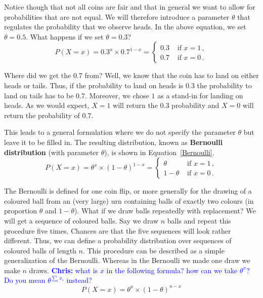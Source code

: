 \documentclass[a4paper,11pt,leqno]{report}
\newcommand{\chris}[1]{ \textcolor{blue}{\textbf{Chris:} #1}}
\begin{document}
Notice though that not all coins are fair and that in general we want to allow for probabilities that are not equal. 
We will therefore introduce a parameter $ \theta $ that regulates the probability that we observe heads. In the
above equation, we set $ \theta = 0.5 $. What happens if we set $ \theta = 0.3 $?
\begin{equation}
P(X=x) = 0.3^{x} \times 0.7^{1-x} = 
\begin{cases}
0.3 & \mbox{ if $x=1$} \, , \\
0.7 & \mbox{ if $x=0$} \, .
\end{cases}
\end{equation}

Where did we get the 0.7 from? Well, we know that the coin has to land on either heads or tails. Thus, if the probability
to land on heads is $ 0.3 $ the probability to land on tails has to be $ 0.7 $. Moreover, we chose $ 1 $ as a stand-in for
landing on heads. As we would expect, $ X = 1 $ will return the $ 0.3 $ probability and $ X = 0 $ will return the probability of $ 0.7 $.

This leads to a general formulation where we do not specify the parameter $ \theta $ but leave it to be filled in. 
The resulting distribution, known as \textbf{Bernoulli distribution} (with parameter $ \theta $), is shown in Equation~\eqref{Bernoulli}.
\begin{equation}\label{Bernoulli}
P(X=x) = \theta^{x} \times (1 - \theta)^{1-x} =
\begin{cases}
\theta & \mbox{ if $x=1$} \, , \\
1-\theta & \mbox{ if $x=0$} \, .
\end{cases}
\end{equation}

The Bernoulli is defined for one coin flip, or more generally for the
drawing of a coloured ball from an (very large) urn containing balls
of exactly two colours (in proportion $\theta$ and $1-\theta$). What if we draw balls repeatedly with replacement? We will get a sequence of coloured balls. 
Say we draw $ n $ balls and repeat this procedure five times. Chances are that the five sequences will look rather different.
Thus, we can define a probability distribution over sequences of
coloured balls of length $ n $. This procedure can be described as a simple generalization
of the Bernoulli. Whereas in the Bernoulli we made one draw we make $
n $ draws. \chris{what is $x$ in the following formula? how can we
  take $\theta^x$? Do you mean $\theta^{\sum_i x_i}$ instead?}
\begin{equation}\label{Multinoulli}
P(X=x) = \theta^{x} \times (1 - \theta)^{n-x}
\end{equation}
\end{document}
